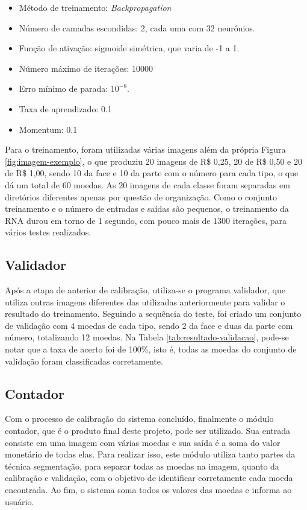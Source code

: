\documentclass[10pt,journal]{IEEEtran}
\begin{document}
\begin{itemize}  
\item Método de treinamento: \textit{Backpropagation}
\item Número de camadas escondidas: 2, cada uma com 32 neurônios.
\item Função de ativação: sigmoide simétrica, que varia de -1 a 1.
\item Número máximo de iterações: 10000
\item Erro mínimo de parada:  $10 ^ {-8}$.
\item Taxa de aprendizado: 0.1
\item Momentum: 0.1
\end{itemize}

Para o treinamento, foram utilizadas várias imagens além da própria Figura \ref{fig:imagem-exemplo}, o que produziu  20 imagens de R\$ 0,25, 20 de R\$ 0,50 e 20 de R\$ 1,00, sendo 10 da face e 10 da parte com o número para cada tipo, o que dá um total de 60 moedas. As 20 imagens de cada classe foram separadas em diretórios diferentes apenas por questão de organização. Como o conjunto treinamento e o número de entradas e saídas são pequenos, o treinamento da RNA durou em torno de 1 segundo, com pouco mais de 1300 iterações, para vários testes realizados.

\subsection{Validador}
\label{sec:validador}

Após a etapa de anterior de calibração, utiliza-se o programa validador, que utiliza outras imagens diferentes das utilizadas anteriormente para validar o resultado do treinamento. Seguindo a sequência do teste, foi criado um conjunto de validação com 4 moedas de cada tipo, sendo 2 da face e duas da parte com número, totalizando 12 moedas. Na Tabela \ref{tab:resultado-validacao}, pode-se notar que a taxa de acerto foi de 100\%, isto é, todas as moedas do conjunto de validação foram classificadas corretamente.

\subsection{Contador}
\label{sec:contador}

Com o processo de calibração do sistema concluído, finalmente o módulo contador, que é o produto final deste projeto, pode ser utilizado. Sua entrada consiste em uma imagem com várias moedas e sua saída é a soma do valor monetário de todas elas. Para realizar isso, este módulo utiliza tanto partes da técnica segmentação, para separar todas as moedas na imagem, quanto da calibração e validação, com o objetivo de identificar corretamente cada moeda encontrada. Ao fim, o sistema soma todos os valores das moedas e informa ao usuário.
\end{document}
